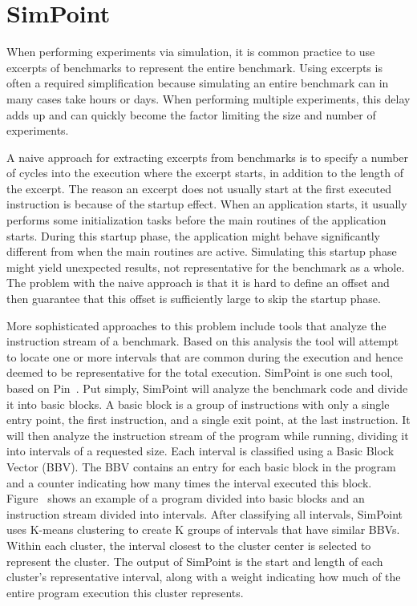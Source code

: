 \section{SimPoint}
\label{sec:background:simpoint}


When performing experiments via simulation, it is common practice to use excerpts of benchmarks to represent the entire benchmark.
Using excerpts is often a required simplification because simulating an entire benchmark can in many cases take hours or days.
When performing multiple experiments, this delay adds up and can quickly become the factor limiting the size and number of experiments.

A naive approach for extracting excerpts from benchmarks is to specify a number of cycles into the execution where the excerpt starts, in addition to the length of the excerpt.
The reason an excerpt does not usually start at the first executed instruction is because of the startup effect.
When an application starts, it usually performs some initialization tasks before the main routines of the application starts.
During this startup phase, the application might behave significantly different from when the main routines are active.
Simulating this startup phase might yield unexpected results, not representative for the benchmark as a whole.
The problem with the naive approach is that it is hard to define an offset and then guarantee that this offset is sufficiently large to skip the startup phase.

More sophisticated approaches to this problem include tools that analyze the instruction stream of a benchmark.
Based on this analysis the tool will attempt to locate one or more intervals that are common during the execution and hence deemed to be representative for the total execution.
SimPoint\cite{Hamerly2005} is one such tool, based on Pin~\cite{Luk2005}.
Put simply, SimPoint will analyze the benchmark code and divide it into basic blocks.
A basic block is a group of instructions with only a single entry point, the first instruction, and a single exit point, at the last instruction.
It will then analyze the instruction stream of the program while running, dividing it into intervals of a requested size. 
Each interval is classified using a Basic Block Vector (BBV).
The BBV contains an entry for each basic block in the program and a counter indicating how many times the interval executed this block.
Figure~ shows an example of a program divided into basic blocks and an instruction stream divided into intervals.
After classifying all intervals, SimPoint uses K-means clustering to create K groups of intervals that have  similar BBVs.
Within each cluster, the interval closest to the cluster center is selected to represent the cluster. 
The output of SimPoint is the start and length of each cluster's representative interval, along with a weight indicating how much of the entire program execution this cluster represents.

